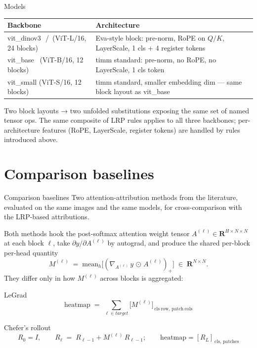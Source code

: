 \documentclass[
  aspectratio=169,
]{beamer}
\newcommand{\reals}{\mathbf{R}}
\begin{document}
\begin{frame}{Models}
\centering\small
\begin{tabular}{ll}
\toprule
Backbone & Architecture \\
\midrule
vit\_dinov3~\cite{darcet2024dinov3}\,/\,\cite{oquab2024dinov2} (ViT-L/16, 24 blocks)
  & Eva-style block: pre-norm, RoPE on $Q/K$, LayerScale, 1 cls + 4 register tokens \\
vit\_base~\cite{dosovitskiy2021vit} (ViT-B/16, 12 blocks)
  & timm standard: pre-norm, no RoPE, no LayerScale, 1 cls token \\
vit\_small (ViT-S/16, 12 blocks)
  & timm standard, smaller embedding dim — same block layout as vit\_base \\
\bottomrule
\end{tabular}

\vspace{4mm}
Two block layouts → two unfolded substitutions exposing the same set
of named tensor ops. The same composite of LRP rules applies to all
three backbones; per-architecture features (RoPE, LayerScale, register
tokens) are handled by rules introduced above.
\end{frame}

\section[Baselines]{Comparison baselines}

\begin{frame}{Comparison baselines}
Two attention-attribution methods from the literature, evaluated on
the same images and the same models, for cross-comparison with the
LRP-based attributions.

Both methods hook the post-softmax attention weight tensor
$A^{(\ell)} \in \reals^{H \times N \times N}$ at each block $\ell$,
take $\partial y / \partial A^{(\ell)}$ by autograd, and produce the
shared per-block per-head quantity
\[
  M^{(\ell)} \;=\; \mathrm{mean}_h\bigl[(\nabla\!_{\!A^{(\ell)}}\, y\,\odot\, A^{(\ell)})_+\bigr]
  \;\in\; \reals^{N \times N}.
\]
They differ only in how $M^{(\ell)}$ across blocks is aggregated:

\begin{block}{LeGrad~\cite{bousselham2024legrad}}
\[
  \mathrm{heatmap} \;=\; \sum_{\ell \in \mathit{target}} \bigl[M^{(\ell)}\bigr]_{\,\mathrm{cls\ row},\,\mathrm{patch\ cols}}
\]
\end{block}

\begin{block}{Chefer's rollout~\cite{chefer2021transformer}}
\[
  R_0 = I,\qquad R_\ell \;=\; R_{\ell-1} + M^{(\ell)}\, R_{\ell-1}; \qquad \mathrm{heatmap} = [R_L]_{\,\mathrm{cls},\,\mathrm{patches}}
\]
\end{block}
\end{frame}
\end{document}
